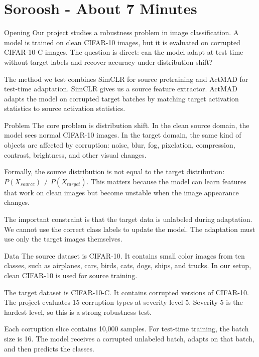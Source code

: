 \documentclass[11pt,a4paper]{article}
\begin{document}
\section{Soroosh - About 7 Minutes}

\begin{sorooshbox}{Opening}
Our project studies a robustness problem in image classification. A model is trained on clean CIFAR-10 images, but it is evaluated on corrupted CIFAR-10-C images. The question is direct: can the model adapt at test time without target labels and recover accuracy under distribution shift?

The method we test combines SimCLR for source pretraining and ActMAD for test-time adaptation. SimCLR gives us a source feature extractor. ActMAD adapts the model on corrupted target batches by matching target activation statistics to source activation statistics.
\end{sorooshbox}

\begin{sorooshbox}{Problem}
The core problem is distribution shift. In the clean source domain, the model sees normal CIFAR-10 images. In the target domain, the same kind of objects are affected by corruption: noise, blur, fog, pixelation, compression, contrast, brightness, and other visual changes.

Formally, the source distribution is not equal to the target distribution: $P(X_{source}) \neq P(X_{target})$. This matters because the model can learn features that work on clean images but become unstable when the image appearance changes.

The important constraint is that the target data is unlabeled during adaptation. We cannot use the correct class labels to update the model. The adaptation must use only the target images themselves.
\end{sorooshbox}

\begin{sorooshbox}{Data}
The source dataset is CIFAR-10. It contains small color images from ten classes, such as airplanes, cars, birds, cats, dogs, ships, and trucks. In our setup, clean CIFAR-10 is used for source training.

The target dataset is CIFAR-10-C. It contains corrupted versions of CIFAR-10. The project evaluates 15 corruption types at severity level 5. Severity 5 is the hardest level, so this is a strong robustness test.

Each corruption slice contains 10,000 samples. For test-time training, the batch size is 16. The model receives a corrupted unlabeled batch, adapts on that batch, and then predicts the classes.
\end{sorooshbox}
\end{document}

